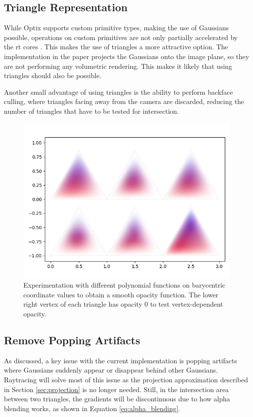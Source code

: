\subsection{Triangle Representation}
While Optix supports custom primitive types, making the use of Gaussians possible, operations on custom primitives are not only partially accelerated by the \gls{rt} cores \cite{nvidiaOptiXQuickStart2018}\cite{nvidiaNVIDIAOptiXProgramming2023}.
This makes the use of triangles a more attractive option.
The implementation in the paper projects the Gaussians onto the image plane, so they are not performing any volumetric rendering.
This makes it likely that using triangles should also be possible.



Another small advantage of using triangles is the ability to perform backface culling, where triangles facing away from the camera are discarded, reducing the number of triangles that have to be tested for intersection.

\begin{figure}
    \centering
    \includegraphics[width=\linewidth]{images/alphas.png}
    \caption{Experimentation with different polynomial functions on barycentric coordinate values to obtain a smooth opacity function. The lower right vertex of each triangle has opacity 0 to test vertex-dependent opacity.}
    \label{fig:alphas}
\end{figure}

\subsection{Remove Popping Artifacts}
As discussed, a key issue with the current implementation is popping artifacts where Gaussians suddenly appear or disappear behind other Gaussians.
Raytracing will solve most of this issue as the projection approximation described in Section \ref{sec:projection} is no longer needed.
Still, in the intersection area between two triangles, the gradients will be discontinuous due to how alpha blending works, as shown in Equation \ref{eq:alpha_blending}.

